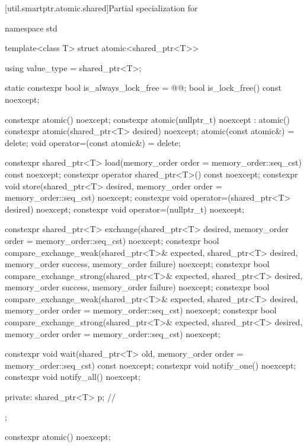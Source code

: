 [util.smartptr.atomic.shared]{Partial specialization for }
%
\begin{codeblock}
namespace std {
  template<class T> struct atomic<shared_ptr<T>> {
    using value_type = shared_ptr<T>;

    static constexpr bool is_always_lock_free = @@;
    bool is_lock_free() const noexcept;

    constexpr atomic() noexcept;
    constexpr atomic(nullptr_t) noexcept : atomic() { }
    constexpr atomic(shared_ptr<T> desired) noexcept;
    atomic(const atomic&) = delete;
    void operator=(const atomic&) = delete;

    constexpr shared_ptr<T> load(memory_order order = memory_order::seq_cst) const noexcept;
    constexpr operator shared_ptr<T>() const noexcept;
    constexpr void store(shared_ptr<T> desired,
                         memory_order order = memory_order::seq_cst) noexcept;
    constexpr void operator=(shared_ptr<T> desired) noexcept;
    constexpr void operator=(nullptr_t) noexcept;

    constexpr shared_ptr<T> exchange(shared_ptr<T> desired,
                                     memory_order order = memory_order::seq_cst) noexcept;
    constexpr bool compare_exchange_weak(shared_ptr<T>& expected, shared_ptr<T> desired,
                                         memory_order success, memory_order failure) noexcept;
    constexpr bool compare_exchange_strong(shared_ptr<T>& expected, shared_ptr<T> desired,
                                           memory_order success, memory_order failure) noexcept;
    constexpr bool compare_exchange_weak(shared_ptr<T>& expected, shared_ptr<T> desired,
                                         memory_order order = memory_order::seq_cst) noexcept;
    constexpr bool compare_exchange_strong(shared_ptr<T>& expected, shared_ptr<T> desired,
                                           memory_order order = memory_order::seq_cst) noexcept;

    constexpr void wait(shared_ptr<T> old,
                        memory_order order = memory_order::seq_cst) const noexcept;
    constexpr void notify_one() noexcept;
    constexpr void notify_all() noexcept;

  private:
    shared_ptr<T> p;            // \expos
  };
}
\end{codeblock}

%
\begin{itemdecl}
constexpr atomic() noexcept;
\end{itemdecl}

